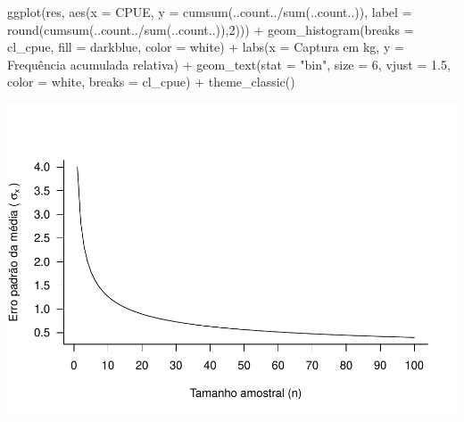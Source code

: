 \documentclass[
]{book}
\newenvironment{Shaded}{\begin{snugshade}}{\end{snugshade}}
\newcommand{\AttributeTok}[1]{\textcolor[rgb]{0.77,0.63,0.00}{#1}}
\newcommand{\DecValTok}[1]{\textcolor[rgb]{0.00,0.00,0.81}{#1}}
\newcommand{\FloatTok}[1]{\textcolor[rgb]{0.00,0.00,0.81}{#1}}
\newcommand{\FunctionTok}[1]{\textcolor[rgb]{0.00,0.00,0.00}{#1}}
\newcommand{\NormalTok}[1]{#1}
\newcommand{\SpecialCharTok}[1]{\textcolor[rgb]{0.00,0.00,0.00}{#1}}
\newcommand{\StringTok}[1]{\textcolor[rgb]{0.31,0.60,0.02}{#1}}
\begin{document}
\begin{Shaded}
\begin{Highlighting}[]
\FunctionTok{ggplot}\NormalTok{(res, }\FunctionTok{aes}\NormalTok{(}\AttributeTok{x =}\NormalTok{ CPUE,}
                \AttributeTok{y =} \FunctionTok{cumsum}\NormalTok{(..count..}\SpecialCharTok{/}\FunctionTok{sum}\NormalTok{(..count..)),}
                \AttributeTok{label =} \FunctionTok{round}\NormalTok{(}\FunctionTok{cumsum}\NormalTok{(..count..}\SpecialCharTok{/}\FunctionTok{sum}\NormalTok{(..count..)),}\DecValTok{2}\NormalTok{))) }\SpecialCharTok{+}
  \FunctionTok{geom\_histogram}\NormalTok{(}\AttributeTok{breaks =}\NormalTok{ cl\_cpue, }
                 \AttributeTok{fill =} \StringTok{\textquotesingle{}darkblue\textquotesingle{}}\NormalTok{, }\AttributeTok{color =} \StringTok{\textquotesingle{}white\textquotesingle{}}\NormalTok{) }\SpecialCharTok{+}
  \FunctionTok{labs}\NormalTok{(}\AttributeTok{x =} \StringTok{\textquotesingle{}Captura em kg\textquotesingle{}}\NormalTok{, }\AttributeTok{y =} \StringTok{\textquotesingle{}Frequência acumulada relativa\textquotesingle{}}\NormalTok{) }\SpecialCharTok{+}
  \FunctionTok{geom\_text}\NormalTok{(}\AttributeTok{stat =} \StringTok{"bin"}\NormalTok{, }\AttributeTok{size =} \DecValTok{6}\NormalTok{, }\AttributeTok{vjust =} \FloatTok{1.5}\NormalTok{, }\AttributeTok{color =} \StringTok{\textquotesingle{}white\textquotesingle{}}\NormalTok{,}
            \AttributeTok{breaks =}\NormalTok{ cl\_cpue) }\SpecialCharTok{+}
  \FunctionTok{theme\_classic}\NormalTok{()}
\end{Highlighting}
\end{Shaded}

\includegraphics{probest-cambientais_files/figure-latex/unnamed-chunk-113-1.pdf}
\end{document}
